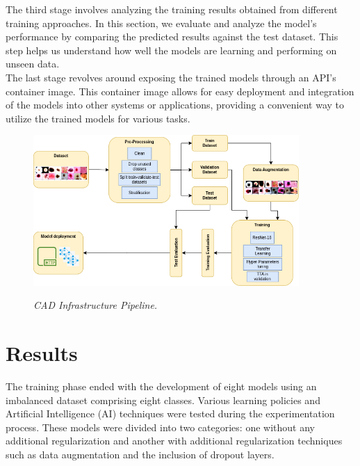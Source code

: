 The third stage involves analyzing the training results obtained from different
training approaches. In this section, we evaluate and analyze the model's
performance by comparing the predicted results against the test dataset. This
step helps us understand how well the models are learning and performing on
unseen data. \\

The last stage revolves around exposing the trained models through an API's
container image. This container image allows for easy deployment and
integration of the models into other systems or applications, providing a
convenient way to utilize the trained models for various tasks. \\


\begin{figure}[H]
  \centering
  \includegraphics[width=0.9\textwidth]{imatges/methodological_contribution/Pipeline.drawio.png}
  \caption[CAD Infrastructure Pipeline]{\textit{CAD Infrastructure Pipeline. }}
  {\label{fig:cad-infrastructure-training-system}}
\end{figure}

\section{Results}

The training phase ended with the development of eight models using an
imbalanced dataset comprising eight classes. Various learning policies and
Artificial Intelligence (AI) techniques were tested during the experimentation
process. These models were divided into two categories: one without any
additional regularization and another with additional regularization techniques
such as data augmentation and the inclusion of dropout layers.

